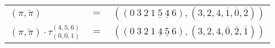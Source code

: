 \begin{example}\label{example:LRYMWOFK}
  \hfill
  \begin{\position}
    \begin{tabular}{lll}
      $(\pi,\breve\pi)$ & $=$ & $(({0}~{3}~{2}~{1}~\underline{{5}}~\underline{{4}}~{6}),(3,2,4,\overline{1},\overline{0},\overline{2}))$ \\
      $(\pi,\breve\pi) \cdot \tau^{(4,5,6)}_{(0,0,1)}$ & $=$ & $(({0}~{3}~{2}~{1}~\underline{{4}}~\underline{{5}}~{6}),(3,2,4,\overline{0},\overline{2},\overline{1}))$ \\
    \end{tabular}
  \end{\position}
\end{example}